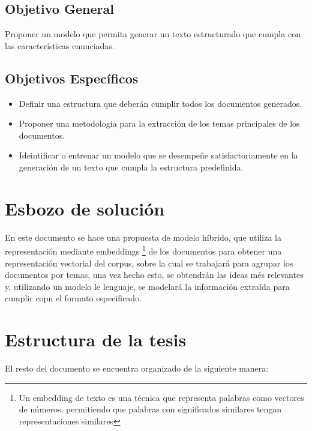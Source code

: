     \subsection{Objetivo General}

        Proponer un modelo que permita generar un texto estructurado que cumpla con las características enunciadas.

    \subsection{Objetivos Específicos}

        \begin{itemize}
            \item Definir una estructura que deberán cumplir todos los documentos generados.
            \item Proponer una metodología para la extracción de los temas principales de los documentos.
            \item Ideintificar o entrenar un modelo que se desempeñe satisfactoriamente en la generación de un texto que cumpla la estructura predefinida.
        \end{itemize}
\section{Esbozo de solución}
    En este documento se hace una propuesta de modelo híbrido, que utiliza la representación mediante embeddings \footnote{Un embedding de texto es una técnica que representa palabras como vectores de números, permitiendo que palabras con significados similares tengan representaciones similares}
    de los documentos para obtener una representación vectorial del corpus, sobre la cual se trabajará para agrupar los documentos por temas, una vez hecho esto, se obtendrán las ideas més relevantes y, utilizando un modelo le lenguaje, se modelará la información extraída para cumplir copn el formato especificado.
\section{Estructura de la tesis}
        El resto del documento se encuentra organizado de la siguiente manera:

